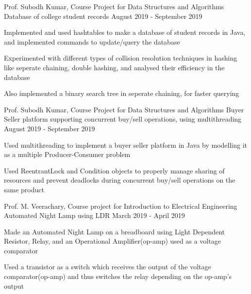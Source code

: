 
\begin{cventries}
  \cventry
    {Prof. Subodh Kumar, Course Project for Data Structures and Algorithms}
    {Database of college student records} %
    {} %
    {August 2019 - September 2019} %
    {
      \begin{cvitems} %
        \item {Implemented and used hashtables to make a database of student records in Java, and implemented commands to update/query the database}
        \item {Experimented with different types of collision resolution techniques in hashing like seperate chaining, double hashing, and analysed their efficiency in the database}
        \item {Also implemented a binary search tree in seperate chaining, for faster querying}
      \end{cvitems}
    }
  \cventry
    {Prof. Subodh Kumar, Course Project for Data Structures and Algorithms}
    {Buyer Seller platform supporting concurrent buy/sell operations, using multithreading} %
    {}
    {August 2019 - September 2019} %
    {
      \begin{cvitems} %
      	\item {Used multithreading to implement a buyer seller platform in Java by modelling it as a multiple Producer-Consumer problem}
      	\item {Used ReentrantLock and Condition objects to properly manage sharing of resources and prevent deadlocks during concurrent buy/sell operations on the same product}
      \end{cvitems}
    }
  \cventry
    {Prof. M. Veerachary, Course project for Introduction to Electrical Engineering}
    {Automated Night Lamp using LDR}
    {}
    {March 2019 - April 2019}
    {
      \begin{cvitems}
        \item {Made an Automated Night Lamp on a breadboard using Light Dependent Resistor, Relay, and an Operational Amplifier(op-amp) used as a voltage comparator}
        \item {Used a transistor as a switch which receives the output of the voltage comparator(op-amp) and thus switches the relay depending on the op-amp's output}
      \end{cvitems}
    }
  \vspace{3mm}

\end{cventries}
